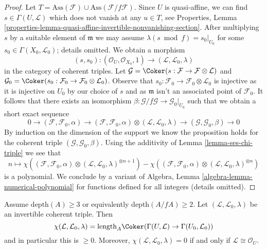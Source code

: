 \begin{proof}
\medskip\noindent
Let $T = \text{Ass}(\mathcal{F}) \cup \text{Ass}(\mathcal{F}/f\mathcal{F})$.
Since $U$ is quasi-affine, we can find $s \in \Gamma(U, \mathcal{L})$
which does not vanish at any $u \in T$, see
Properties, Lemma
\ref{properties-lemma-quasi-affine-invertible-nonvanishing-section}.
After multiplying $s$ by a suitable element of $\mathfrak m$
we may assume $\lambda(s \bmod f) = s_0|_{U_0}$ for some
$s_0 \in \Gamma(X_0, \mathcal{L}_0)$; details omitted.
We obtain a morphism
$$
(s, s_0) :
(\mathcal{O}_U, \mathcal{O}_{X_0}, 1)
\longrightarrow
(\mathcal{L}, \mathcal{L}_0, \lambda)
$$
in the category of coherent triples. Let
$\mathcal{G} = \Coker(s : \mathcal{F} \to \mathcal{F} \otimes \mathcal{L})$
and
$\mathcal{G}_0 = \Coker(s_0 : \mathcal{F}_0 \to
\mathcal{F}_0 \otimes \mathcal{L}_0)$. Observe that $s_0 : \mathcal{F}_0 \to
\mathcal{F}_0 \otimes \mathcal{L}_0$ is injective as it is injective
on $U_0$ by our choice of $s$ and as $\mathfrak m$ isn't an
associated point of $\mathcal{F}_0$. It follows that
there exists an
isomorphism $\beta : \mathcal{G}/f\mathcal{G} \to \mathcal{G}_0|_{U_0}$
such that we obtain a short exact sequence
$$
0 \to
(\mathcal{F}, \mathcal{F}_0, \alpha) \to
(\mathcal{F}, \mathcal{F}_0, \alpha) \otimes
(\mathcal{L}, \mathcal{L}_0, \lambda) \to
(\mathcal{G}, \mathcal{G}_0, \beta) \to 0
$$
By induction on the dimension of the support we know the proposition
holds for the coherent triple $(\mathcal{G}, \mathcal{G}_0, \beta)$.
Using the additivity of Lemma \ref{lemma-ses-chi-triple}
we see that
$$
n \longmapsto 
\chi((\mathcal{F}, \mathcal{F}_0, \alpha) \otimes
(\mathcal{L}, \mathcal{L}_0, \lambda)^{\otimes n + 1})
-
\chi((\mathcal{F}, \mathcal{F}_0, \alpha) \otimes
(\mathcal{L}, \mathcal{L}_0, \lambda)^{\otimes n})
$$
is a polynomial. We conclude by a variant of
Algebra, Lemma \ref{algebra-lemma-numerical-polynomial}
for functions defined for all integers (details omitted).
\end{proof}

\begin{lemma}
\label{lemma-nonnegative-chi-triple}
Assume $\text{depth}(A) \geq 3$ or equivalently
$\text{depth}(A/fA) \geq 2$. Let $(\mathcal{L}, \mathcal{L}_0, \lambda)$
be an invertible coherent triple. Then
$$
\chi(\mathcal{L}, \mathcal{L}_0, \lambda) =
\text{length}_A \Coker(\Gamma(U, \mathcal{L}) \to \Gamma(U_0, \mathcal{L}_0))
$$
and in particular this is $\geq 0$. Moreover, 
$\chi(\mathcal{L}, \mathcal{L}_0, \lambda) = 0$ if and only if
$\mathcal{L} \cong \mathcal{O}_U$.
\end{lemma}

